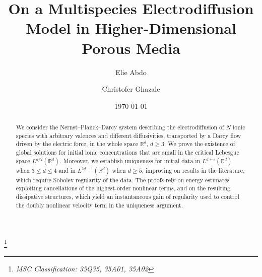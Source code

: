 \documentclass[11pt,reqno]{amsart}
\title{On a Multispecies Electrodiffusion Model in Higher-Dimensional Porous Media}
\author{Elie Abdo}
\author{Christofer Ghazale}
\date{\today}
\begin{document}
\begin{abstract}
We consider the Nernst--Planck--Darcy system describing the
electrodiffusion of $N$ ionic species with arbitrary valences and
different diffusivities, transported by a Darcy flow driven by the
electric force, in the whole space $\mathbb{R}^d$, $d \ge 3$. We prove
the existence of global solutions for initial ionic concentrations
that are small in the critical Lebesgue space
$L^{d/2}(\mathbb{R}^d)$.  Moreover, we establish
uniqueness for initial data in $L^{d+\epsilon}(\mathbb{R}^d)$ when
$3 \le d \le 4$ and in $L^{2d-1}(\mathbb{R}^d)$ when $d \ge 5$,
improving on results in the literature, which require Sobolev
regularity of the data. The proofs rely on energy estimates exploiting
cancellations of the highest-order nonlinear terms, and on the
resulting dissipative structures, which yield an instantaneous gain of
regularity used to control the doubly nonlinear velocity term in the
uniqueness argument.
\end{abstract}


\noindent\thanks{\em{MSC Classification: 35Q35, 35A01, 35A02}}

\maketitle
\end{document}
